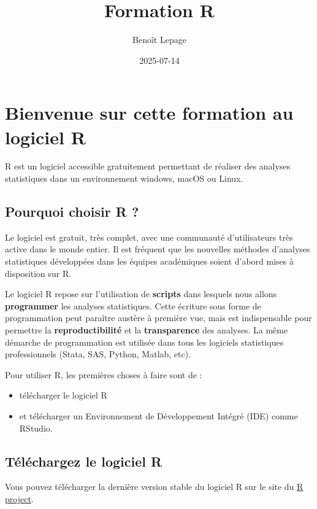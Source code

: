 \documentclass[
]{book}
\title{Formation R}
\author{Benoît Lepage}
\date{2025-07-14}
\providecommand{\tightlist}{%
  \setlength{\itemsep}{0pt}\setlength{\parskip}{0pt}}
\begin{document}
\maketitle

{
\setcounter{tocdepth}{1}
\tableofcontents
}
\chapter{Bienvenue sur cette formation au logiciel R}\label{bienvenue-sur-cette-formation-au-logiciel-r}

R est un logiciel accessible gratuitement permettant de réaliser des analyses statistiques dans un environnement windows, macOS ou Linux.

\section{Pourquoi choisir R ?}\label{pourquoi-choisir-r}

Le logiciel est gratuit, très complet, avec une communauté d'utilisateurs très active dans le monde entier. Il est fréquent que les nouvelles méthodes d'analyses statistiques développées dans les équipes académiques soient d'abord mises à disposition sur R.

Le logiciel R repose sur l'utilisation de \textbf{scripts} dans lesquels nous allons \textbf{programmer} les analyses statistiques. Cette écriture sous forme de programmation peut paraître austère à première vue, mais est indispensable pour permettre la \textbf{reproductibilité} et la \textbf{transparence} des analyses. La même démarche de programmation est utilisée dans tous les logiciels statistiques professionnels (Stata, SAS, Python, Matlab, etc).

Pour utiliser R, les premières choses à faire sont de :

\begin{itemize}
\tightlist
\item
  télécharger le logiciel R
\item
  et télécharger un Environnement de Développement Intégré (IDE) comme RStudio.
\end{itemize}

\section{Téléchargez le logiciel R}\label{tuxe9luxe9chargez-le-logiciel-r}

Vous pouvez télécharger la dernière version stable du logiciel R sur le site du \href{https://www.r-project.org/}{R project}.
\end{document}
